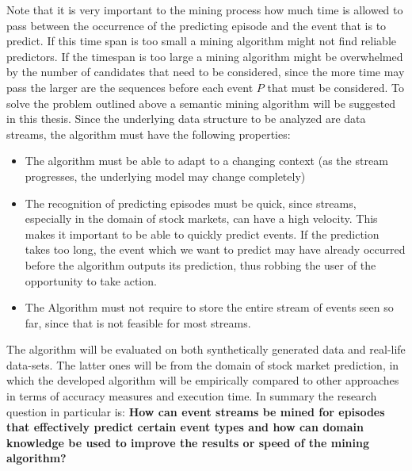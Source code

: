 Note that it is very important to the mining process how much time is allowed to pass between the occurrence of the predicting episode and the event that is to predict. If this time span is too small a mining algorithm might not find reliable predictors. If the timespan is too large a mining algorithm might be overwhelmed by the number of candidates that need to be considered, since the more time may pass the larger are the sequences before each event $P$ that must be considered. %
\newline
To solve the problem outlined above a semantic mining algorithm will be suggested in this thesis. Since the underlying data structure to be analyzed are data streams, the algorithm must have the following properties:
\begin{itemize}
	\item The algorithm must be able to adapt to a changing context (as the stream progresses, the underlying model may change completely)
	\item The recognition of predicting episodes must be quick, since streams, especially in the domain of stock markets, can have a high velocity. This makes it important to be able to quickly predict events. If the prediction takes too long, the event which we want to predict may have already occurred before the algorithm outputs its prediction, thus robbing the user of the opportunity to take action.
	\item The Algorithm must not require to store the entire stream of events seen so far, since that is not feasible for most streams.
\end{itemize}

The algorithm will be evaluated on both synthetically generated data and real-life data-sets. The latter ones will be from the domain of stock market prediction, in which the developed algorithm will be empirically compared to other approaches in terms of accuracy measures and execution time. In summary the research question in particular is:\newline \newline
\textbf{How can event streams be mined for episodes that effectively predict certain event types and how can domain knowledge be used to improve the results or speed of the mining algorithm?}